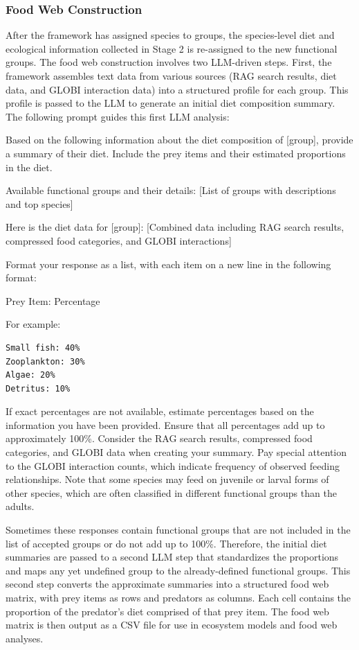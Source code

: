 \subsubsection{Food Web Construction}

After the framework has assigned species to groups, the species-level diet and ecological information collected in Stage 2 is re-assigned to the new functional groups. The food web construction involves two LLM-driven steps. First, the framework assembles text data from various sources (RAG search results, diet data, and GLOBI interaction data) into a structured profile for each group. This profile is passed to the LLM to generate an initial diet composition summary. The following prompt guides this first LLM analysis:

\begin{prompt}
Based on the following information about the diet composition of [group], provide a summary of their diet. Include the prey items and their estimated proportions in the diet.

Available functional groups and their details:
[List of groups with descriptions and top species]

Here is the diet data for [group]:
[Combined data including RAG search results, compressed food categories, and GLOBI interactions]

Format your response as a list, with each item on a new line in the following format:

Prey Item: Percentage

For example:
\begin{verbatim}
Small fish: 40%
Zooplankton: 30%
Algae: 20%
Detritus: 10%
\end{verbatim}

If exact percentages are not available, estimate percentages based on the information you have been provided.
Ensure that all percentages add up to approximately 100\%.
Consider the RAG search results, compressed food categories, and GLOBI data when creating your summary.
Pay special attention to the GLOBI interaction counts, which indicate frequency of observed feeding relationships.
Note that some species may feed on juvenile or larval forms of other species, which are often classified in different functional groups than the adults.
\end{prompt}

Sometimes these responses contain functional groups that are not included in the list of accepted groups or do not add up to 100\%. Therefore, the initial diet summaries are passed to a second LLM step that standardizes the proportions and maps any yet undefined group to the already-defined functional groups. This second step converts the approximate summaries into a structured food web matrix, with prey items as rows and predators as columns. Each cell contains the proportion of the predator's diet comprised of that prey item. The food web matrix is then output as a CSV file for use in ecosystem models and food web analyses.

